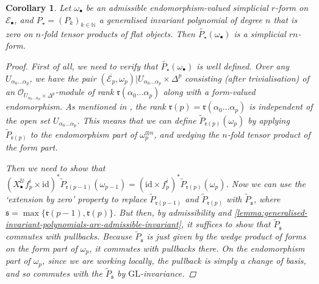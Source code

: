 \documentclass[11pt,fleqn]{article}
\theoremstyle{plain}
\newtheorem{corollary}[theorem]{Corollary}
\theoremstyle{definition}
\theoremstyle{remark}
\numberwithin{equation}{theorem}
\newcommand{\cover}{\mathcal{U}}
\newcommand{\OO}{\mathcal{O}}
\newcommand{\anotherbullet}{\star}
\newcommand{\restricted}{\mathbin{\big\vert}}
\newcommand{\id}{\mathrm{id}}
\newcommand{\GL}{\mathrm{GL}}
\newcommand{\nerve}[1]{X_{#1}^\cover}
\begin{document}
        \begin{corollary}\label{corollary:invariant-polynomial-of-admissible-form-is-simplicial}
            Let $\omega_\bullet$ be an admissible endomorphism-valued simplicial $r$-form on $\mathcal{E}_\bullet$, and $P_\anotherbullet=(P_k)_{k\in\mathbb{N}}$ a generalised invariant polynomial of degree $n$ that is zero on $n$-fold tensor products of flat objects.
            Then $\widetilde{P_\anotherbullet}(\omega_\bullet)$ is a simplicial $rn$-form.
            \begin{proof}
                First of all, we need to verify that $\widetilde{P_\anotherbullet}(\omega_\bullet)$ is well defined.
                Over any $U_{\alpha_0\ldots\alpha_p}$, we have the pair $(\overline{\mathcal{E}_p},\omega_p)\restricted U_{\alpha_0\ldots\alpha_p}\times\Delta^p$ consisting (after trivialisation) of an $\OO_{U_{\alpha_0\ldots\alpha_p}\times\Delta^p}$-module of rank $\mathfrak{r}(\alpha_0\ldots\alpha_p)$ along with a form-valued endomorphism.
                As mentioned in \cite[Remark~2.2.3]{Hosgood2020a}, the rank $\mathfrak{r}(p)=\mathfrak{r}(\alpha_0\ldots\alpha_p)$ is independent of the open set $U_{\alpha_0\ldots\alpha_p}$.
                This means that we can define $\widetilde{P}_{\mathfrak{r}(p)}(\omega_p)$ by applying $\widetilde{P}_{\mathfrak{r}(p)}$ to the endomorphism part of $\omega_p^{\otimes n}$, and wedging the $n$-fold tensor product of the form part.

                Then we need to show that $(\nerve{\bullet} f_p^i\times\id)^*\widetilde{P}_{\mathfrak{r}(p-1)}(\omega_{p-1}) = (\id\times f_p^i)^*\widetilde{P}_{\mathfrak{r}(p)}(\omega_p)$.
                Now we can use the `extension by zero' property to replace $\widetilde{P}_{\mathfrak{r}(p-1)}$ and $\widetilde{P}_{\mathfrak{r}(p)}$ with $\widetilde{P}_{\mathfrak{s}}$, where $\mathfrak{s}=\max\{\mathfrak{r}(p-1),\mathfrak{r}(p)\}$.
                But then, by admissibility and \cref{lemma:generalised-invariant-polynomials-are-admissible-invariant}, it suffices to show that $\widetilde{P}_\mathfrak{s}$ commutes with pullbacks.
                Because $\widetilde{P}_{\mathfrak{s}}$ is just given by the wedge product of forms on the form part of $\omega_p$, it commutes with pullbacks there.
                On the endomorphism part of $\omega_p$, since we are working locally, the pullback is simply a change of basis, and so commutes with the $\widetilde{P}_{\mathfrak{s}}$ by $\GL$-invariance.
            \end{proof}
        \end{corollary}
\end{document}
